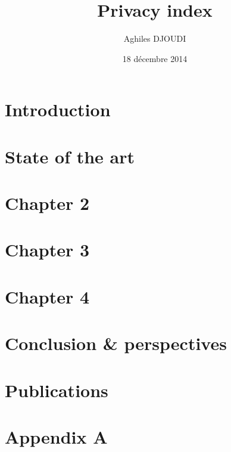 \documentclass[a4paper, 12pt, twoside,openright]{report}
\title     {Privacy index}
\author    {Aghiles DJOUDI}
\date{18 décembre 2014}
\begin{document}

\preface
	
	
	
	\setcounter{mtc}{2}

\body
	\chapter{Introduction}
		

	\chapter{State of the art}
	\minitoc
		
		
		
		
		

	\chapter{Chapter 2}
	\minitoc
		
		
		
		
		
		

	\chapter{Chapter 3}
	\minitoc
		
		
		
		
		
		

	\chapter{Chapter 4}
	\minitoc
		
		
		
		
		
		
	\chapter{Conclusion \& perspectives}
		
		
	\chapter{Publications}
		

\appendix
	\chapter{Appendix A}
	\minitoc
		
		
		
		
		
\end{document}
